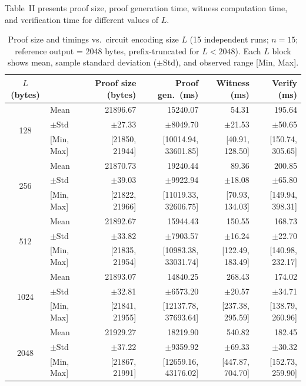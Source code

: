 \documentclass[10pt,conference,a4paper]{IEEEtran}
\begin{document}
Table~II presents proof size, proof generation time, witness computation time, and verification time for different values of $L$.

\begin{table}[htbp]
\centering
\caption{Proof size and timings vs.\ circuit encoding size $L$ (15 independent runs; $n=15$; reference output = 2048 bytes, prefix-truncated for $L < 2048$). Each $L$ block shows mean, sample standard deviation ($\pm$Std), and observed range [Min, Max].}
\label{tab:results}
\footnotesize
\begin{tabular}{c l r r r r}
\hline
\hline
$L$ (bytes) & & Proof size (bytes) & Proof gen.\ (ms) & Witness (ms) & Verify (ms) \\
\hline
\multirow{3}{*}{128}
  & Mean      & 21896.67 & 15240.07 &  54.31 & 195.64 \\
  & $\pm$Std  & $\pm$27.33 & $\pm$8049.70 & $\pm$21.53 & $\pm$50.65 \\
  & {[Min, Max]} & {[21850, 21944]} & {[10014.94, 33601.85]} & {[40.91, 128.50]} & {[150.74, 305.65]} \\
\hline
\multirow{3}{*}{256}
  & Mean      & 21870.73 & 19240.44 &  89.36 & 200.85 \\
  & $\pm$Std  & $\pm$39.03 & $\pm$9922.94 & $\pm$18.08 & $\pm$65.80 \\
  & {[Min, Max]} & {[21822, 21966]} & {[11019.33, 32606.75]} & {[70.93, 134.03]} & {[149.94, 398.31]} \\
\hline
\multirow{3}{*}{512}
  & Mean      & 21892.67 & 15944.43 & 150.55 & 168.73 \\
  & $\pm$Std  & $\pm$33.82 & $\pm$7903.57 & $\pm$16.24 & $\pm$22.70 \\
  & {[Min, Max]} & {[21835, 21954]} & {[10983.38, 33031.74]} & {[122.49, 183.49]} & {[140.98, 232.17]} \\
\hline
\multirow{3}{*}{1024}
  & Mean      & 21893.07 & 14840.25 & 268.43 & 174.02 \\
  & $\pm$Std  & $\pm$32.81 & $\pm$6573.20 & $\pm$20.57 & $\pm$34.71 \\
  & {[Min, Max]} & {[21841, 21955]} & {[12137.78, 37693.64]} & {[237.38, 295.59]} & {[138.79, 260.96]} \\
\hline
\multirow{3}{*}{2048}
  & Mean      & 21929.27 & 18219.90 & 540.82 & 182.45 \\
  & $\pm$Std  & $\pm$37.22 & $\pm$9359.92 & $\pm$69.33 & $\pm$30.32 \\
  & {[Min, Max]} & {[21867, 21991]} & {[12659.16, 43176.02]} & {[447.87, 704.70]} & {[152.73, 259.90]} \\
\hline
\hline
\end{tabular}
\end{table}
\end{document}
